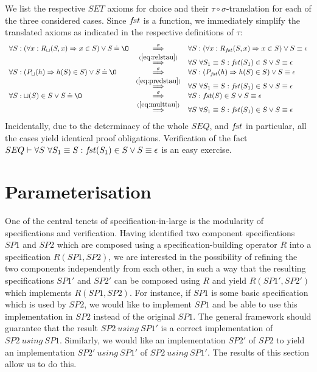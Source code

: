 We list the respective $SET$ axioms for choice and their $\tau\circ\sigma$-translation for each of the three considered cases. Since $f\!st$ is a function, we
immediately simplify the translated axioms as indicated in the respective definitions of $\tau$:
\[
\begin{array}{lcl}
\forall S:(\forall x: \Pre R\ch(S,x)\impl x\in S)\lor S\Eq\es & \TTo{\sigma}& \forall S:(\forall x: \Pre R{\fst}(S,x)\impl x\in S)\lor S\equiv\epsilon \\ & \TTo{\re{eq:relstau}}&
\forall S\ \forall S_1\equiv S : \fst(S_1)\in S \lor S\equiv\epsilon \\ \forall S : (\Pre P\ch(h)\impl h(S)\in S)\lor S\Eq\es & \TTo{\sigma} & \forall S : (\Pre P{\fst}(h)\impl h(S)\in S)\lor S\equiv\epsilon \\ & \TTo{\re{eq:predstau}} &
\forall S\ \forall S_1\equiv S : \fst(S_1)\in S \lor S\equiv\epsilon \\ \forall S: \ch(S)\in S\lor S\Eq\es & \TTo{\sigma}& \forall S: \fst(S)\in S\lor S\equiv\epsilon \\ & \TTo{\re{eq:multtau}}&
\forall S\ \forall S_1\equiv S : \fst(S_1)\in S \lor S\equiv\epsilon \end{array}
\]
Incidentally, due to the determinacy of the whole $SEQ$, and $f\!st$ in particular,
all the cases yield identical proof obligations. Verification of the fact $SEQ\vdash\forall S\ \forall S_1\equiv S : f\!st(S_1)\in S \lor S\equiv\epsilon$
is an easy exercise.


\section{Parameterisation}\label{se:parameter} One of the central tenets of specification-in-large is the modularity of specifications and verification. Having identified two component specifications
$SP1$ and $SP2$ which are composed using a specification-building operator $R$
into a specification $R(SP1,SP2)$, we are interested in the possibility of refining the two components independently from
each other, in such a way that the resulting specifications $SP1'$ and $SP2'$ can be composed using $R$ and yield $R(SP1',SP2')$ which implements $R(SP1,SP2).$
For instance, if $SP1$ is some basic
specification which is used by $SP2$, we would like to implement $SP1$ and be able to use this implementation in $SP2$ instead of the original $SP1$. The general framework should guarantee that the result $SP2\ using\ SP1'$ is a correct implementation of $SP2\ using\ SP1$. Similarly, we would like an implementation $SP2'$ of $SP2$ to yield an implementation $SP2'\ using\ SP1'$
of $SP2\ using\ SP1'$. The results of this section allow us to do this. 

